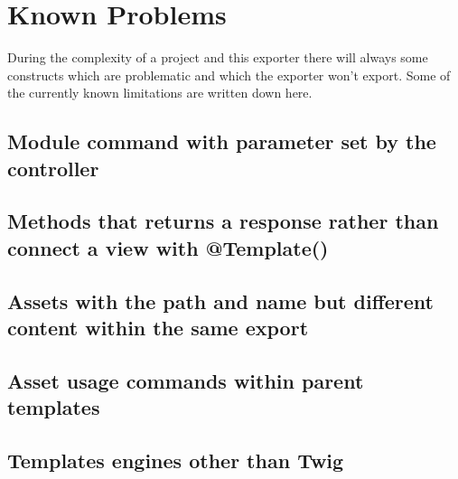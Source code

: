 \section{Known Problems}
During the complexity of a project and this exporter there will always some constructs which are problematic and which the exporter won't export. Some of the currently known limitations are written down here.

\subsection{Module command with parameter set by the controller}

\subsection{Methods that returns a response rather than connect a view with @Template()}

\subsection{Assets with the path and name but different content within the same export}

\subsection{Asset usage commands within parent templates}

\subsection{Templates engines other than Twig}